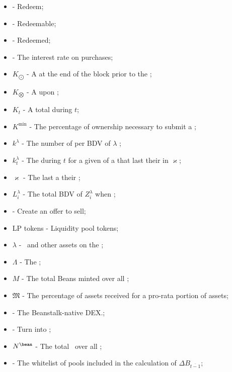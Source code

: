 \documentclass[class=article, crop=false]{standalone}
\begin{document}
\begin{itemize}[topsep=0pt, itemsep=3pt,leftmargin=16pt]
    \item[]  - Redeem;
    \item[]  - Redeemable;
    \item[]  - Redeemed;
    \item[]  - The interest rate on  purchases;
    \item[] $K_{\bigodot}$ - A   at the end of the block prior to the ;
    \item[] $K_{\bigotimes}$ - A   upon ;
    \item[] $K_t$ - A  total  during $t$;
    \item[] $K^{\text{min}}$ - The percentage of  ownership necessary to submit a ;
    \item[] $k^{\lambda}$ - The number of  per BDV of $\lambda$ ;
    \item[] $k_{t}^{\lambda}$ - The  during $t$ for a given  of a  that last  their   in $\varkappa$;
    \item[] $\varkappa$ - The last  a   their  ;
    \item[] $L_i^{\lambda}$ - The total BDV of $Z_i^{\lambda}$ when ;
    \item[]  - Create an offer to sell;
    \item[] LP tokens - Liquidity pool tokens;
    \item[] $\lambda$ - \Bean\ and other assets on the  ;
    \item[] $\Lambda$ - The  ;
    \item[] $M$ - The total Beans minted over all ;
    \item[] $\mathfrak{M}$ - The percentage of  assets received for  a pro-rata portion of  assets;
    \item[]  - The Beanstalk-native DEX.;
    \item[]  - Turn   into ;
    \item[] $N^{\bean}$ - The total  \Bean\ over all ;
    \item[]   - The whitelist of pools included in the calculation of $\Delta B_{\overline{t-1}}$;

\end{itemize}
\end{document}
